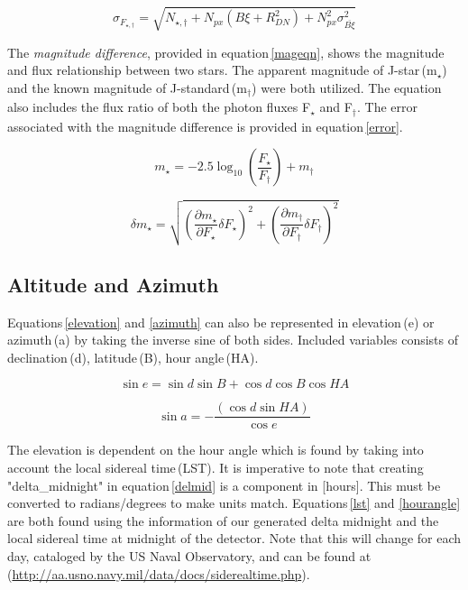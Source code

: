 \documentclass[onecolumn]{aastex6}
\begin{document}
\begin{equation}
\sigma_{F_{\star,\dagger}} = \sqrt{N_{\star,\dagger} +  N_{px}(B\xi + R_{DN}^2) + N_{px}^2\sigma_{\overline{B\xi}}^2               }
\end{equation}


The \textit{magnitude difference}, provided in equation\,\ref{mageqn}, shows the magnitude and flux relationship between two stars. The apparent magnitude of J-star\,(m$_{\star}$) and the known magnitude of J-standard\,(m$_{\dagger}$) were both utilized. The equation also includes the flux ratio of both the photon fluxes F$_{\star}$ and F$_{\dagger}$. The error associated with the magnitude difference is provided in equation\,\ref{error}. 


\begin{equation}
m_{\star}=-2.5\log_{10}{\left( \frac{F_{\star}}{F_{\dagger}}\right)}+m_{\dagger}
\label{mageqn}
\end{equation}


\begin{equation}
\delta m_{\star} = \sqrt{\left(\frac{\partial m_{\star}}{\partial F_{\star}}\delta F_{\star}\right)^2 + \left(\frac{\partial m_{\dagger}}{\partial F_{\dagger}}\delta F_{\dagger}\right)^2}
\label{error}
\end{equation}

\subsection{Altitude and Azimuth}
Equations\,\ref{elevation} and \ref{azimuth} can also be represented in elevation\,(e) or azimuth\,(a) by taking the inverse sine of both sides. Included variables consists of declination\,(d), latitude\,(B), hour angle\,(HA).

\begin{equation}
\sin{e} = \sin{d}\sin{B} + \cos{d}\cos{B}\cos{HA}
\label{elevation}
\end{equation}

\begin{equation}
\sin{a} = - \frac{(\cos{d}\sin{HA})}{\cos{e}}
\label{azimuth}
\end{equation}

The elevation is dependent on the hour angle which is found by taking into account the local sidereal time\,(LST). It is imperative to note that creating "delta\_midnight" in equation\,\ref{delmid} is a component in [hours]. This must be converted to radians/degrees to make units match. Equations\,\ref{lst} and \ref{hourangle} are both found using the information of our generated delta midnight and the local sidereal time at midnight of the detector. Note that this will change for each day, cataloged by the US Naval Observatory, and can be found at\,(\url{http://aa.usno.navy.mil/data/docs/siderealtime.php}).
\end{document}
